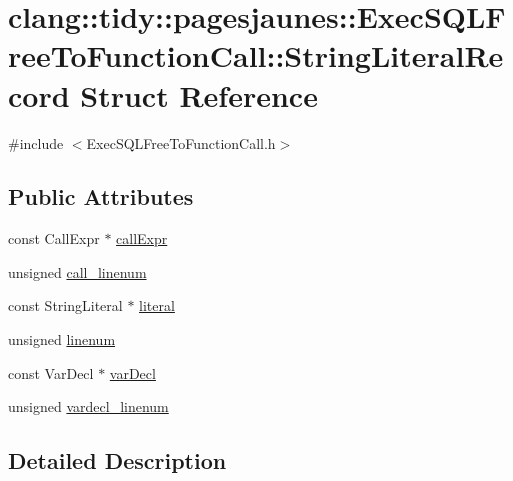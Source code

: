 \hypertarget{structclang_1_1tidy_1_1pagesjaunes_1_1_exec_s_q_l_free_to_function_call_1_1_string_literal_record}{}\section{clang\+:\+:tidy\+:\+:pagesjaunes\+:\+:Exec\+S\+Q\+L\+Free\+To\+Function\+Call\+:\+:String\+Literal\+Record Struct Reference}
\label{structclang_1_1tidy_1_1pagesjaunes_1_1_exec_s_q_l_free_to_function_call_1_1_string_literal_record}


{\ttfamily \#include $<$Exec\+S\+Q\+L\+Free\+To\+Function\+Call.\+h$>$}

\subsection*{Public Attributes}
\begin{DoxyCompactItemize}
\item 
const Call\+Expr $\ast$ \hyperlink{structclang_1_1tidy_1_1pagesjaunes_1_1_exec_s_q_l_free_to_function_call_1_1_string_literal_record_a53125ca06b6f6304025368c6566df84d}{call\+Expr}
\item 
unsigned \hyperlink{structclang_1_1tidy_1_1pagesjaunes_1_1_exec_s_q_l_free_to_function_call_1_1_string_literal_record_af6f8e7b7f8c1d2b2690d1b2f46c92d97}{call\+\_\+linenum}
\item 
const String\+Literal $\ast$ \hyperlink{structclang_1_1tidy_1_1pagesjaunes_1_1_exec_s_q_l_free_to_function_call_1_1_string_literal_record_a5955dfd71a0080c56c832f33146cb6e0}{literal}
\item 
unsigned \hyperlink{structclang_1_1tidy_1_1pagesjaunes_1_1_exec_s_q_l_free_to_function_call_1_1_string_literal_record_a5ed400b1d472cb1ef79e582fbe06ef35}{linenum}
\item 
const Var\+Decl $\ast$ \hyperlink{structclang_1_1tidy_1_1pagesjaunes_1_1_exec_s_q_l_free_to_function_call_1_1_string_literal_record_a0109d853582df09980dee667dcfdd75c}{var\+Decl}
\item 
unsigned \hyperlink{structclang_1_1tidy_1_1pagesjaunes_1_1_exec_s_q_l_free_to_function_call_1_1_string_literal_record_a4d9f64a5b1f145b401fbab4ca804a67b}{vardecl\+\_\+linenum}
\end{DoxyCompactItemize}


\subsection{Detailed Description}


